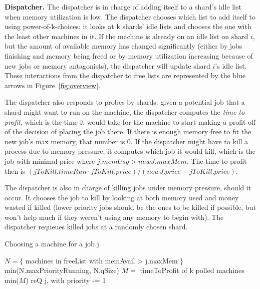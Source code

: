 \textbf{Dispatcher.}
The dispatcher is in charge of adding itself to a shard's idle list when memory
utilization is low. The dispatcher chooses which list to add itself to using
power-of-k-choices: it looks at k shards' idle lists and chooses the one with
the least other machines in it. If the machine is already on an idle list on
shard $i$, but the amount of available memory has changed significantly (either
by jobs finishing and memory being freed or by memory utilization increasing
because of new jobs or memory antagonists), the dispatcher will update shard
$i$'s idle list. These interactions from the dispatcher to free lists are
represented by the blue arrows in Figure~\ref{fig:overview}.

The dispatcher also responds to probes by shards: given a potential job that a
shard might want to run on the machine, the dispatcher computes the \textit{time
to profit}, which is the time it would take for the machine to start making a
profit off of the decision of placing the job there. If there is enough memory
free to fit the new job's max memory, that number is 0. If the dispatcher might
have to kill a process due to memory pressure, it computes which job it would
kill, which is the job with minimal price where $j.memUsg > newJ.maxMem$. The
time to profit then is $(jToKill.timeRun \cdot jToKill.price) / (newJ.price
- jToKill.price)$.

The dispatcher is also in charge of killing jobs under memory pressure, should
it occur. It chooses the job to kill by looking at both memory used and money
wasted if killed (lower priority jobs should be the ones to be killed if
possible, but won't help much if they weren't using any memory to begin with).
The dispatcher requeues killed jobs at a randomly chosen shard.

\makeatletter
\renewcommand{\ALG@name}{Procedure}
\makeatother
\begin{algorithm}[t]
\caption{Choosing a machine for a job j}\label{alg:place}
\begin{algorithmic}
    \State$N = \{ $ machines in freeList with memAvail > j.maxMem $\}$
     \\
        \Return$ $min(N.maxPriorityRunning, N.qSize)
    \EndIf
    \State$M = $ timeToProfit of k polled machines
     \\
        \Return$ $min($M$)
    \Else
        \State$ $reQ j, with priority -= 1
    \EndIf
\end{algorithmic}
\end{algorithm}


